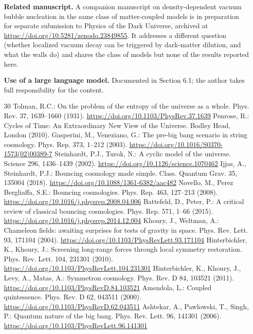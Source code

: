 \documentclass[pdflatex,sn-mathphys-num]{sn-jnl}
\begin{document}
\noindent\textbf{Related manuscript.} A companion manuscript on density-dependent vacuum bubble nucleation in the same class of matter-coupled models is in preparation for separate submission to Physics of the Dark Universe, archived at \url{https://doi.org/10.5281/zenodo.23849855}. It addresses a different question (whether localized vacuum decay can be triggered by dark-matter dilution, and what the walls do) and shares the class of models but none of the results reported here.

\noindent\textbf{Use of a large language model.} Documented in Section 6.1; the author takes full responsibility for the content.

\begin{thebibliography}{30}
 Tolman, R.C.: On the problem of the entropy of the universe as a whole. Phys. Rev. 37, 1639--1660 (1931). \url{https://doi.org/10.1103/PhysRev.37.1639}
 Penrose, R.: Cycles of Time: An Extraordinary New View of the Universe. Bodley Head, London (2010).
 Gasperini, M., Veneziano, G.: The pre-big bang scenario in string cosmology. Phys. Rep. 373, 1--212 (2003). \url{https://doi.org/10.1016/S0370-1573(02)00389-7}
 Steinhardt, P.J., Turok, N.: A cyclic model of the universe. Science 296, 1436--1439 (2002). \url{https://doi.org/10.1126/science.1070462}
 Ijjas, A., Steinhardt, P.J.: Bouncing cosmology made simple. Class. Quantum Grav. 35, 135004 (2018). \url{https://doi.org/10.1088/1361-6382/aac482}
 Novello, M., Perez Bergliaffa, S.E.: Bouncing cosmologies. Phys. Rep. 463, 127--213 (2008). \url{https://doi.org/10.1016/j.physrep.2008.04.006}
 Battefeld, D., Peter, P.: A critical review of classical bouncing cosmologies. Phys. Rep. 571, 1--66 (2015). \url{https://doi.org/10.1016/j.physrep.2014.12.004}
 Khoury, J., Weltman, A.: Chameleon fields: awaiting surprises for tests of gravity in space. Phys. Rev. Lett. 93, 171104 (2004). \url{https://doi.org/10.1103/PhysRevLett.93.171104}
 Hinterbichler, K., Khoury, J.: Screening long-range forces through local symmetry restoration. Phys. Rev. Lett. 104, 231301 (2010). \url{https://doi.org/10.1103/PhysRevLett.104.231301}
 Hinterbichler, K., Khoury, J., Levy, A., Matas, A.: Symmetron cosmology. Phys. Rev. D 84, 103521 (2011). \url{https://doi.org/10.1103/PhysRevD.84.103521}
 Amendola, L.: Coupled quintessence. Phys. Rev. D 62, 043511 (2000). \url{https://doi.org/10.1103/PhysRevD.62.043511}
 Ashtekar, A., Pawlowski, T., Singh, P.: Quantum nature of the big bang. Phys. Rev. Lett. 96, 141301 (2006). \url{https://doi.org/10.1103/PhysRevLett.96.141301}

\end{thebibliography}
\end{document}
